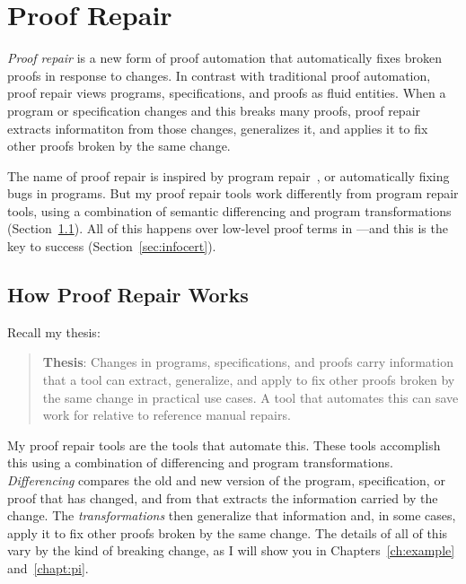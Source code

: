 \section{Proof Repair}
\label{sec:mot-rep}

\textit{Proof repair} is a new form of proof automation that automatically fixes broken proofs in response to changes.
In contrast with traditional proof automation, proof repair views programs, specifications, and proofs as fluid entities.
When a program or specification changes and this breaks many proofs, proof repair extracts informatiton from those
changes, generalizes it, and applies it to fix other proofs broken by the same change.

The name of proof repair is inspired by program repair~\cite{Monperrus:2018:ASR:3177787.3105906, Gazzola:2018:ASR:3180155.3182526},
or automatically fixing bugs in programs.
But my proof repair tools work differently from program repair tools, 
using a combination of semantic differencing and program transformations (Section~\ref{sec:how}).
All of this happens over low-level proof terms in ---and this is the key to success (Section~\ref{sec:infocert}).

\subsection{How Proof Repair Works}
\label{sec:how}

Recall my thesis:

\begin{quote}
\textbf{Thesis}: Changes in programs, specifications, and proofs carry information that a tool can extract, generalize, and apply to fix other proofs broken by the same change in practical use cases. A tool that automates this can save work for  relative to reference manual repairs.
\end{quote}
My proof repair tools are the tools that automate this.
These tools accomplish this using a combination of differencing and program transformations.
\textit{Differencing} compares the old and new version of the program, specification, or proof that has changed,
and from that extracts the information carried by the change.
The \textit{transformations} then generalize that information and, in some cases, apply it to fix other proofs broken by the same change.
The details of all of this vary by the kind of breaking change,
as I will show you in Chapters~\ref{ch:example} and~\ref{chapt:pi}.


